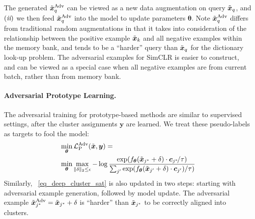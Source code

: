 \documentclass[10pt,twocolumn,letterpaper]{article}
\newcommand{\RN}[1]{\textup{\lowercase\expandafter{\it \romannumeral#1}}}
\newcommand{\cv}[0]{{\boldsymbol{c}}}
\newcommand{\xv}{\boldsymbol{x}}
\newcommand{\yv}{\boldsymbol{y}}
\newcommand{\thetav}{\boldsymbol{\theta}}
\newcommand{\Lcal}{\mathcal{L}}
\begin{document}
The generated $\Tilde{\xv}^{\text{Adv}}_q$ can be viewed as a new data augmentation on query $\Tilde{\xv}_q$, and $(\RN{2})$  we then feed  $\Tilde{\xv}^{\text{Adv}}_q$ into the model to update parameters $\thetav$. Note $\Tilde{\xv}^{\text{Adv}}_q$ differs from traditional random augmentations in that it  takes into consideration of the relationship between the positive example $\Tilde{\xv}_{k}$ and all negative examples within the memory bank, and tends to be a ``harder'' query than $\Tilde{\xv}_q$  for the dictionary look-up problem. 
The adversarial examples for SimCLR is easier to construct, and can be viewed as a special case when all negative examples are from current batch, rather than from memory bank.



\paragraph{Adversarial Prototype Learning.}
The adversarial training for prototype-based methods are similar to supervised settings, after the cluster assignments $\yv$ are learned. We treat these pseudo-labels as targets to fool the model:\vspace{-2mm}
\begin{align} 
\vspace{-4mm}
& \min_{\thetav} \Lcal^{\text{Adv}}_{\text{P}} ( \Tilde{\xv}, \yv)= \nonumber\\
\vspace{-1mm}
& \min_{\thetav}  \max_{ \| \delta \|_{2} \le \epsilon }  -\log \frac{\exp(f_{\thetav} (\Tilde{\xv}_{j^*} + \delta)  \cdot \cv_{j^*}  \! /\tau)}{ \sum_{j'}\exp(f_{\thetav} (\Tilde{\xv}_{j'} + \delta) \cdot \cv_{j'}   ) /\tau) }  
\vspace{-1mm}
\label{eq_deep_cluster_sat}
\end{align}
Similarly, ~\eqref{eq_deep_cluster_sat} is also updated in two steps: starting with adversarial example generation, followed by model update. The adversarial example $\Tilde{\xv}^{\text{Adv}}_{j^*} = \Tilde{\xv}_{j^*} + \delta $ is ``harder'' than $\Tilde{\xv}_{j^*}$ to be correctly aligned into clusters. 
\end{document}
